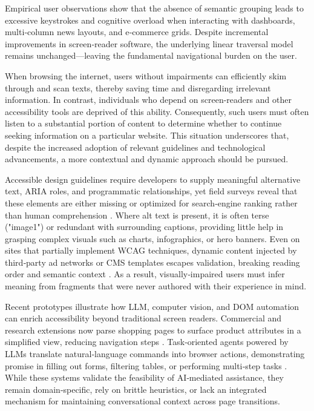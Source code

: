 \documentclass[conference]{IEEEtran}
\begin{document}
Empirical user observations show that the absence of semantic grouping leads to excessive keystrokes and cognitive overload when interacting with dashboards, multi‑column news layouts, and e‑commerce grids. Despite incremental improvements in screen‑reader software, the underlying linear traversal model remains unchanged—leaving the fundamental navigational burden on the user. \cite{ferdous2021semantic}

When browsing the internet, users without impairments can efficiently skim through and scan texts, thereby saving time and disregarding irrelevant information. In contrast, individuals who depend on screen-readers and other accessibility tools are deprived of this ability. Consequently, such users must often listen to a substantial portion of content to determine whether to continue seeking information on a particular website. \cite{Ramakrishnan2017-rn} This situation underscores that, despite the increased adoption of relevant guidelines and technological advancements, a more contextual and dynamic approach should be pursued.

Accessible design guidelines require developers to supply meaningful alternative text, ARIA roles, and programmatic relationships, yet field surveys reveal that these elements are either missing or optimized for search‑engine ranking rather than human comprehension \cite{wcag2023}. Where alt text is present, it is often terse ("image1") or redundant with surrounding captions, providing little help in grasping complex visuals such as charts, infographics, or hero banners. Even on sites that partially implement WCAG techniques, dynamic content injected by third‑party ad networks or CMS templates escapes validation, breaking reading order and semantic context \cite{wcagchallenges2025}. As a result, visually‑impaired users must infer meaning from fragments that were never authored with their experience in mind.

Recent prototypes illustrate how LLM, computer vision, and DOM automation can enrich accessibility beyond traditional screen readers. Commercial and research extensions now parse shopping pages to surface product attributes in a simplified view, reducing navigation steps \cite{prakash2024}. Task‑oriented agents powered by LLMs translate natural‑language commands into browser actions, demonstrating promise in filling out forms, filtering tables, or performing multi‑step tasks  \cite{he2024webvoyager}. While these systems validate the feasibility of AI‑mediated assistance, they remain domain‑specific, rely on brittle heuristics, or lack an integrated mechanism for maintaining conversational context across page transitions.\cite{kodandaram2024,mehendale2024}
\end{document}
